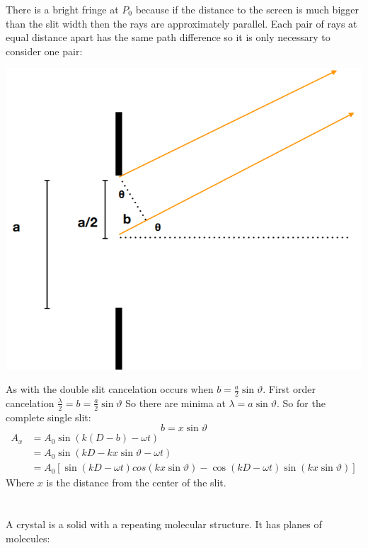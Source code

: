 \documentclass{article}
\begin{document}
There is a bright fringe at \(P_0\) because if the distance to the screen is much bigger than the slit width then the rays are approximately parallel. Each pair of rays at equal distance apart has the same path difference so it is only necessary to consider one pair:

\begin{center}
\includegraphics[scale=0.3]{SingleSlit2}
\end{center}

As with the double slit cancelation occurs when \(b=\frac a2\sin\vartheta\). First order cancelation \(\frac{\lambda}{2}=b=\frac a2\sin\vartheta\) So there are minima at \(\lambda=a\sin\vartheta\). So for the complete single slit:
\[b=x\sin\vartheta\]
\begin{align*}
A_x &= A_0\sin(k(D-b)-\omega t)\\
&= A_0\sin(kD-kx\sin\vartheta-\omega t)\\
&= A_0[\sin(kD-\omega t)cos(kx\sin\vartheta)-\cos(kD-\omega t)\sin(kx\sin\vartheta)]
\end{align*}
Where \(x\) is the distance from the center of the slit.

\section{}

A crystal is a solid with a repeating molecular structure. It has planes of molecules:
\end{document}
